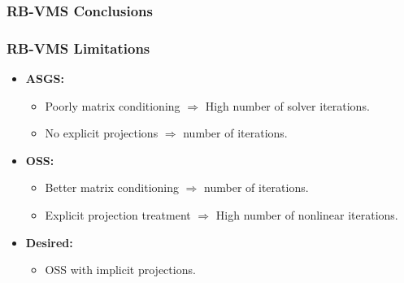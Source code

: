 \begin{frame}
\frametitle{RB-VMS Conclusions}
\vfill
\begin{itemize}
\end{itemize}
\vfill
\end{frame}
\begin{frame}
\frametitle{RB-VMS Limitations}
\vfill
\begin{itemize}
	\item<1-> \textbf{ASGS:}
	\begin{itemize}
		\item<2-> Poorly matrix conditioning $ \Rightarrow $ \alert{High} number of \alert{solver} iterations.
		\item<3-> No explicit projections $ \Rightarrow $  number of  iterations.
	\end{itemize}
	\item<4-> \textbf{OSS:}
	\begin{itemize}
		\item<5-> Better matrix conditioning $ \Rightarrow $  number of  iterations.
		\item<6-> Explicit projection treatment $ \Rightarrow $ \alert{High} number of \alert{nonlinear} iterations.
	\end{itemize}
	\item<7-> \textbf{Desired:} 
		\begin{itemize}
		\item<7-> OSS with implicit projections.
		\end{itemize}
\end{itemize}
\vfill
\end{frame}

